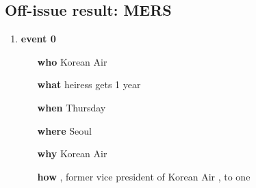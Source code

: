 \subsection{Off-issue result: MERS}
\begin{enumerate}
    \item \textbf{event 0}
    \begin{enumerate}
        \item[\textbf{who}] Korean Air
        \item[\textbf{what}] heiress gets 1 year
        \item[\textbf{when}] Thursday
        \item[\textbf{where}] Seoul
        \item[\textbf{why}] Korean Air
        \item[\textbf{how}] , former vice president of Korean Air , to one
    \end{enumerate}


\end{enumerate}
